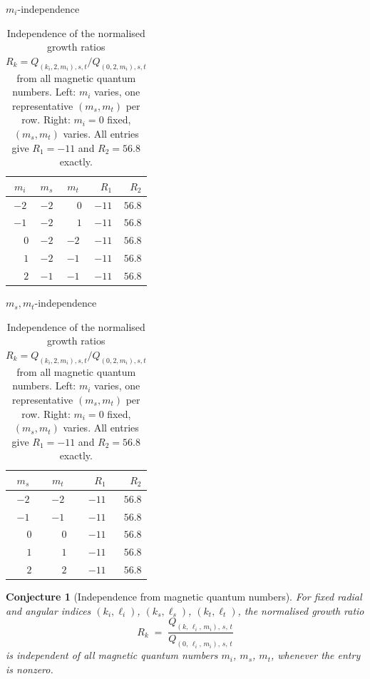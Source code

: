 \documentclass{article}
\newtheorem{conjecture}{Conjecture}
\begin{document}
\begin{table}[h]
\centering
\begin{minipage}{0.50\textwidth}
\centering
{\small $m_i$-independence \quad [$k_s{=}k_t{=}0,\;\ell_s{=}\ell_t{=}2$]}
\vspace{4pt}

\begin{tabular}{ccc|rr}
\hline
$m_i$ & $m_s$ & $m_t$ & $R_1$ & $R_2$ \\
\hline
$-2$ & $-2$ & $\phantom{-}0$ & $-11$ & $56.8$ \\
$-1$ & $-2$ & $\phantom{-}1$ & $-11$ & $56.8$ \\
$\phantom{-}0$ & $-2$ & $-2$ & $-11$ & $56.8$ \\
$\phantom{-}1$ & $-2$ & $-1$ & $-11$ & $56.8$ \\
$\phantom{-}2$ & $-1$ & $-1$ & $-11$ & $56.8$ \\
\hline
\end{tabular}
\end{minipage}
\hfill
\begin{minipage}{0.45\textwidth}
\centering
{\small $m_s,m_t$-independence \quad [$\ell_i{=}2,\,m_i{=}0,\;k_s{=}k_t{=}0,\;\ell_s{=}\ell_t{=}2$]}
\vspace{4pt}

\begin{tabular}{cc|rr}
\hline
$m_s$ & $m_t$ & $R_1$ & $R_2$ \\
\hline
$-2$ & $-2$ & $-11$ & $56.8$ \\
$-1$ & $-1$ & $-11$ & $56.8$ \\
$\phantom{-}0$ & $\phantom{-}0$ & $-11$ & $56.8$ \\
$\phantom{-}1$ & $\phantom{-}1$ & $-11$ & $56.8$ \\
$\phantom{-}2$ & $\phantom{-}2$ & $-11$ & $56.8$ \\
\hline
\end{tabular}
\end{minipage}
\caption{Independence of the normalised growth ratios
         $R_k = Q_{(k_i,2,m_i),s,t}/Q_{(0,2,m_i),s,t}$
         from all magnetic quantum numbers.
         Left: $m_i$ varies, one representative $(m_s,m_t)$ per row.
         Right: $m_i=0$ fixed, $(m_s,m_t)$ varies.
         All entries give $R_1=-11$ and $R_2=56.8$ exactly.}
\label{tab:m_indep}
\end{table}

\begin{conjecture}[Independence from magnetic quantum numbers]
For fixed radial and angular indices $(k_i, \ell_i)$, $(k_s, \ell_s)$,
$(k_t, \ell_t)$, the normalised growth ratio
\[
  R_k \;=\; \frac{Q_{(k,\,\ell_i,\,m_i),\,s,\,t}}{Q_{(0,\,\ell_i,\,m_i),\,s,\,t}}
\]
is independent of all magnetic quantum numbers $m_i$, $m_s$, $m_t$,
whenever the entry is nonzero.
\end{conjecture}
\end{document}
